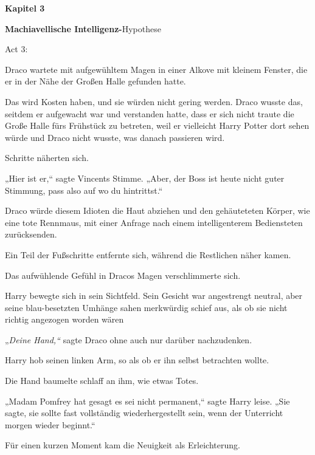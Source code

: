 

\hypertarget{machiavellische-intelligenz-hypothese}{%

\textbf{Kapitel 3}

\textbf{Machiavellische Intelligenz-}Hypothese

Act 3:

Draco wartete mit aufgewühltem Magen in einer Alkove mit kleinem Fenster, die er in der Nähe der Großen Halle gefunden hatte.

Das wird Kosten haben, und sie würden nicht gering werden. Draco wusste das, seitdem er aufgewacht war und verstanden hatte, dass er sich nicht traute die Große Halle fürs Frühstück zu betreten, weil er vielleicht Harry Potter dort sehen würde und Draco nicht wusste, was danach passieren wird.

Schritte näherten sich.

„Hier ist er,“ sagte Vincents Stimme. „Aber, der Boss ist heute nicht guter Stimmung, pass also auf wo du hintrittst.“

Draco würde diesem Idioten die Haut abziehen und den gehäuteteten Körper, wie eine tote Rennmaus, mit einer Anfrage nach einem intelligenterem Bediensteten zurücksenden.

Ein Teil der Fußschritte entfernte sich, während die Restlichen näher kamen.

Das aufwühlende Gefühl in Dracos Magen verschlimmerte sich.

Harry bewegte sich in sein Sichtfeld. Sein Gesicht war angestrengt neutral, aber seine blau-besetzten Umhänge sahen merkwürdig schief aus, als ob sie nicht richtig angezogen worden wären \later

„\emph{Deine Hand,“} sagte Draco ohne auch nur darüber nachzudenken.

Harry hob seinen linken Arm, so als ob er ihn selbst betrachten wollte.

Die Hand baumelte schlaff an ihm, wie etwas Totes.

„Madam Pomfrey hat gesagt es sei nicht permanent,“ sagte Harry leise. „Sie sagte, sie sollte fast vollständig wiederhergestellt sein, wenn der Unterricht morgen wieder beginnt.“

Für einen kurzen Moment kam die Neuigkeit als Erleichterung.

}
